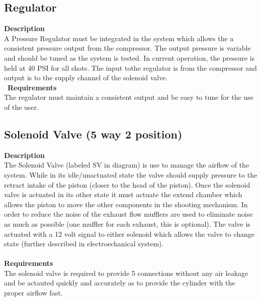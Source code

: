 \documentclass[titlepage]{article}
\begin{document}

\subsection{Regulator}
\textbf{Description}\\
A Pressure Regulator must be integrated in the system which allows the a consistent pressure output from the compressor. The output pressure is variable and should be tuned as the system is tested. In current operation, the pressure is held at 40 PSI for all shots. The input tothe regulator is from the compressor and output is to the supply channel of the solenoid valve.\\\
\textbf{Requirements}\\
The regulator must maintain a consistent output and be easy to tune for the use of the user. 



\subsection{Solenoid Valve (5 way 2 position)}
\textbf{Description}\\
The Solenoid Valve (labeled SV in diagram) is use to manage the airflow of the system. While in its idle/unactuated state the valve should supply pressure to the retract intake of the piston (closer to the head of the piston). Once the solenoid valve is actuated in its other state it must actuate the extend chamber which allows the piston to move the other components in the shooting mechanism. In order to reduce the noise of the exhaust flow mufflers are used to eliminate noise as much as possible (one muffler for each exhaust, this is optional). The valve is actuated with a 12 volt signal to either solenoid which allows the valve to change state (further described in electroechanical system). \\~\\
\textbf{Requirements}\\
The solenoid valve is required to provide 5 connections without any air leakage and be actauted quickly and accurately as to provide the cylinder with the proper airflow fast.

\end{document}
